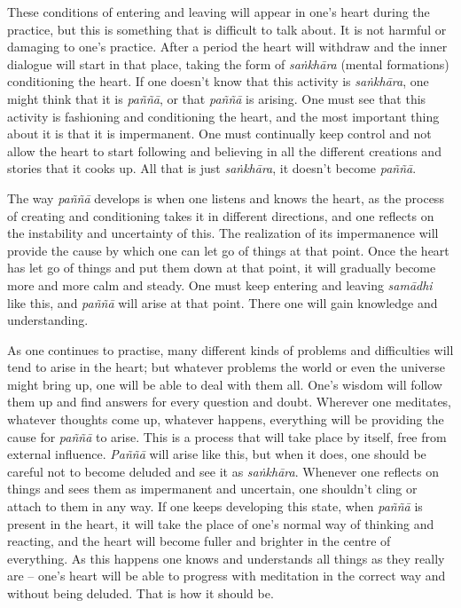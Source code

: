 These conditions of entering and leaving will appear in one's heart
during the practice, but this is something that is difficult to talk
about. It is not harmful or damaging to one's practice. After a period
the heart will withdraw and the inner dialogue will start in that place, 
taking the form of \emph{saṅkhāra} (mental formations) conditioning the
heart. If one doesn't know that this activity is \emph{saṅkhāra}, one
might think that it is \emph{paññā}, or that \emph{paññā} is arising. 
One must see that this activity is fashioning and conditioning the
heart, and the most important thing about it is that it is impermanent. 
One must continually keep control and not allow the heart to start
following and believing in all the different creations and stories that
it cooks up. All that is just \emph{saṅkhāra}, it doesn't become
\emph{paññā}. 

The way \emph{paññā} develops is when one listens and knows the heart, 
as the process of creating and conditioning takes it in different
directions, and one reflects on the instability and uncertainty of this. 
The realization of its impermanence will provide the cause by which one
can let go of things at that point. Once the heart has let go of things
and put them down at that point, it will gradually become more and more
calm and steady. One must keep entering and leaving \emph{samādhi} like
this, and \emph{paññā} will arise at that point. There one will gain
knowledge and understanding. 

As one continues to practise, many different kinds of problems and
difficulties will tend to arise in the heart; but whatever problems the
world or even the universe might bring up, one will be able to deal with
them all. One's wisdom will follow them up and find answers for every
question and doubt. Wherever one meditates, whatever thoughts come up, 
whatever happens, everything will be providing the cause for
\emph{paññā} to arise. This is a process that will take place by itself, 
free from external influence. \emph{Paññā} will arise like this, but
when it does, one should be careful not to become deluded and see it as
\emph{saṅkhāra}. Whenever one reflects on things and sees them as
impermanent and uncertain, one shouldn't cling or attach to them in any
way. If one keeps developing this state, when \emph{paññā} is present in
the heart, it will take the place of one's normal way of thinking and
reacting, and the heart will become fuller and brighter in the centre of
everything. As this happens one knows and understands all things as they
really are -- one's heart will be able to progress with meditation in
the correct way and without being deluded. That is how it should be. 

